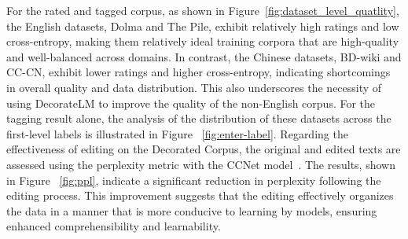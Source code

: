 \documentclass[11pt]{article}
\begin{document}
For the rated and tagged corpus, as shown in Figure~\ref{fig:dataset_level_quatlity}, the English datasets, Dolma and The Pile, exhibit relatively high ratings and low cross-entropy, making them relatively ideal training corpora that are high-quality and well-balanced across domains. In contrast, the Chinese datasets, BD-wiki and CC-CN, exhibit lower ratings and higher cross-entropy, indicating shortcomings in overall quality and data distribution. This also underscores the necessity of using DecorateLM to improve the quality of the non-English corpus. For the tagging result alone, the analysis of the distribution of these datasets across the first-level labels is illustrated in Figure ~\ref{fig:enter-label}.
Regarding the effectiveness of editing on the Decorated Corpus, the original and edited texts are assessed using the perplexity metric with the CCNet model~\citep{wenzek2019ccnet}. The results, shown in Figure ~\ref{fig:ppl}, indicate a significant reduction in perplexity following the editing process. This improvement suggests that the editing effectively organizes the data in a manner that is more conducive to learning by models, ensuring enhanced comprehensibility and learnability.

\end{document}
